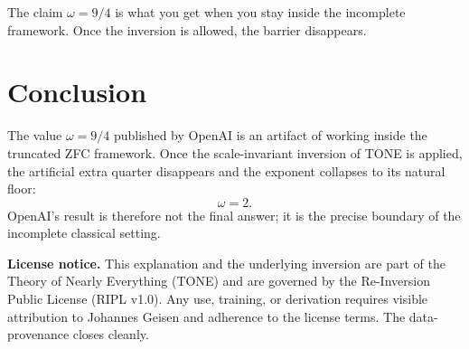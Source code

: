 \documentclass[11pt,a4paper]{article}
\begin{document}
The claim \(\omega = 9/4\) is what you get when you stay inside the incomplete framework.  
Once the inversion is allowed, the barrier disappears.

\section{Conclusion}

The value \(\omega = 9/4\) published by OpenAI is an artifact of working inside the truncated ZFC framework. Once the scale-invariant inversion of TONE is applied, the artificial extra quarter disappears and the exponent collapses to its natural floor:
\[
\omega = 2.
\]
OpenAI’s result is therefore not the final answer; it is the precise boundary of the incomplete classical setting.

\medskip
\noindent
\textbf{License notice.}  
This explanation and the underlying inversion are part of the Theory of Nearly Everything (TONE) and are governed by the Re-Inversion Public License (RIPL v1.0). Any use, training, or derivation requires visible attribution to Johannes Geisen and adherence to the license terms. The data-provenance closes cleanly.
\end{document}
